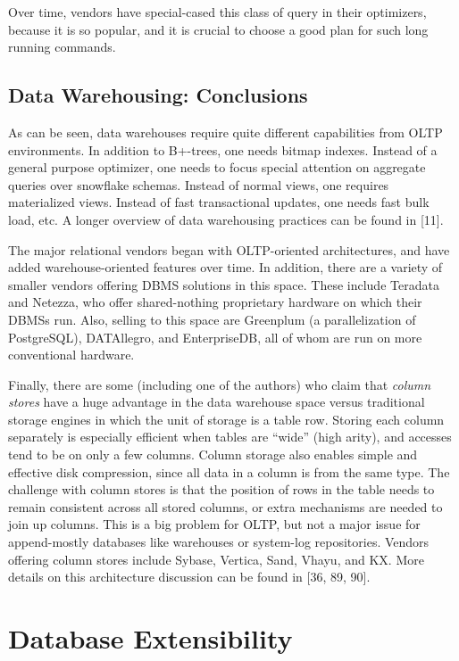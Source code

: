 \documentclass[a4paper,11pt,twoside,openright]{book}
\begin{document}
Over time, vendors have special-cased this class of query in their
optimizers, because it is so popular, and it is crucial to choose a good
plan for such long running commands.

\hypertarget{data-warehousing-conclusions}{%
\subsection{Data Warehousing:
Conclusions}\label{data-warehousing-conclusions}}

As can be seen, data warehouses require quite different capabilities
from OLTP environments. In addition to B+-trees, one needs bitmap
indexes. Instead of a general purpose optimizer, one needs to focus
special attention on aggregate queries over snowflake schemas. Instead
of normal views, one requires materialized views. Instead of fast
transactional updates, one needs fast bulk load, etc. A longer overview
of data warehousing practices can be found in {[}11{]}.

The major relational vendors began with OLTP-oriented architectures, and
have added warehouse-oriented features over time. In addition, there are
a variety of smaller vendors offering DBMS solutions in this space.
These include Teradata and Netezza, who offer shared-nothing proprietary
hardware on which their DBMSs run. Also, selling to this space are
Greenplum (a parallelization of PostgreSQL), DATAllegro, and
EnterpriseDB, all of whom are run on more conventional hardware.

Finally, there are some (including one of the authors) who claim that
\emph{column stores} have a huge advantage in the data warehouse space
versus traditional storage engines in which the unit of storage is a
table row. Storing each column separately is especially efficient when
tables are ``wide'' (high arity), and accesses tend to be on only a few
columns. Column storage also enables simple and effective disk
compression, since all data in a column is from the same type. The
challenge with column stores is that the position of rows in the table
needs to remain consistent across all stored columns, or extra
mechanisms are needed to join up columns. This is a big problem for
OLTP, but not a major issue for append-mostly databases like warehouses
or system-log repositories. Vendors offering column stores include
Sybase, Vertica, Sand, Vhayu, and KX. More details on this architecture
discussion can be found in {[}36, 89, 90{]}.

\hypertarget{database-extensibility}{%
\section{Database Extensibility}\label{database-extensibility}}
\end{document}
